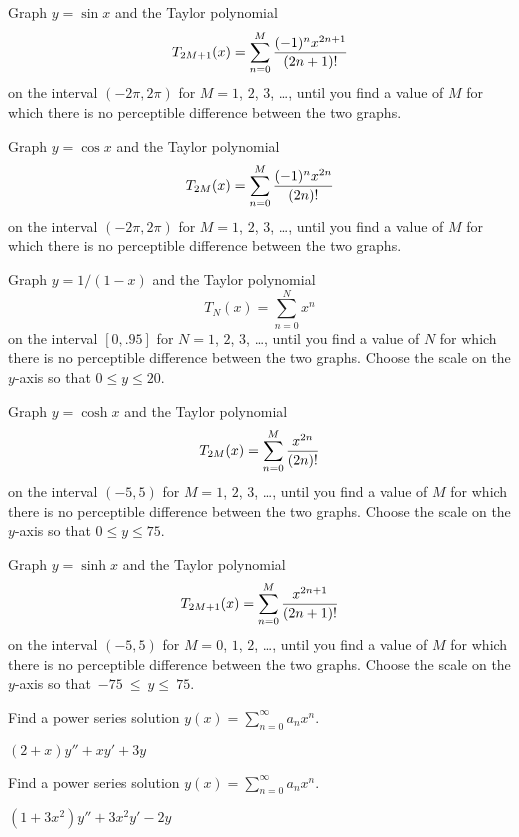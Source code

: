 \documentclass{ximera}
\begin{document}
\begin{problem}\label{exer:7.1.6}  
Graph $y=\sin x$ and the Taylor polynomial
$$
T_{2M+1}(x)=\sum_{n=0}^M{(-1)^nx^{2n+1}\over(2n+1)!}
$$
on the interval $(-2\pi,2\pi)$ for $M=1$, $2$, $3$, \dots, until you find
a value of $M$ for which there is no perceptible difference between the
two graphs.
\end{problem}


\begin{problem}\label{exer:7.1.7}  
Graph $y=\cos x$ and the Taylor polynomial
$$
T_{2M}(x)=\sum_{n=0}^M{(-1)^nx^{2n}\over(2n)!}
$$
on the interval $(-2\pi,2\pi)$ for $M=1$, $2$, $3$, \dots, until you find a
value of $M$ for which there is no perceptible difference between the
two graphs.
\end{problem}

\begin{problem}\label{exer:7.1.8}  
Graph $y=1/(1-x)$ and the Taylor polynomial
$$
T_N(x)=\sum_{n=0}^Nx^n
$$
on the interval $[0,.95]$ for $N=1$, $2$, $3$, \dots, until you find a
value of $N$ for which there is no perceptible difference between the
two graphs. Choose the scale on the $y$-axis so that $0\le y\le20$.
\end{problem}

\begin{problem}\label{exer:7.1.9}  
Graph $y=\cosh x$ and the Taylor polynomial
$$
T_{2M}(x)=\sum_{n=0}^M{x^{2n}\over(2n)!}
$$
on the interval $(-5,5)$ for $M=1$, $2$, $3$, \dots, until you find a
value of $M$ for which there is no perceptible difference between the
two graphs.
 Choose the scale on the $y$-axis so that $0\le y\le75$.
\end{problem}

\begin{problem}\label{exer:7.1.10}  
Graph $y=\sinh x$ and the Taylor polynomial
$$
T_{2M+1}(x)=\sum_{n=0}^M{x^{2n+1}\over(2n+1)!}
$$
on the interval $(-5,5)$ for $M=0$, $1$, $2$, \dots, until you find a
value of $M$ for which there is no perceptible difference between the
two graphs.  Choose the scale on the $y$-axis so that~$-75~\le~y\le~75$.
 \end{problem}

\begin{problem}\label{exer:7.1.11}
Find a power series solution $y(x)=\sum_{n=0}^\infty a_nx^n$.

$(2+x)y''+xy'+3y$
\end{problem}

\begin{problem}\label{exer:7.1.12}
Find a power series solution $y(x)=\sum_{n=0}^\infty a_nx^n$.

$(1+3x^2)y''+3x^2y'-2y$
\end{problem}
\end{document}
